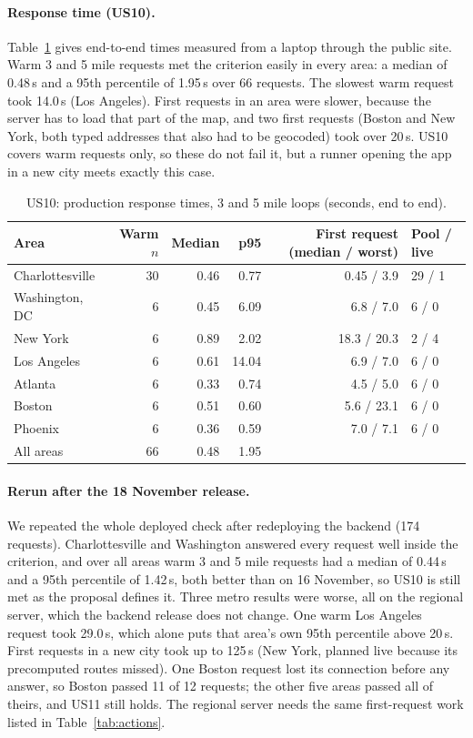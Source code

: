 \paragraph{Response time (US10).}
Table~\ref{tab:latency} gives end-to-end times measured from a laptop
through the public site. Warm 3 and 5 mile requests met the criterion easily
in every area: a median of 0.48\,s and a 95th percentile of 1.95\,s over 66
requests. The slowest warm request took 14.0\,s (Los Angeles). First requests
in an area were slower, because the server has to load that part of the map,
and two first requests (Boston and New York, both typed addresses that also
had to be geocoded) took over 20\,s. US10 covers warm requests only, so these
do not fail it, but a runner opening the app in a new city meets exactly this
case.

\begin{table}[ht]
\centering\small
\caption{US10: production response times, 3 and 5 mile loops (seconds, end to end).}
\label{tab:latency}
\begin{tabular}{@{}l r r r r l@{}}
\toprule
Area & Warm $n$ & Median & p95 & First request (median / worst) & Pool / live \\
\midrule
Charlottesville & 30 & 0.46 & 0.77 & 0.45 / 3.9 & 29 / 1 \\
Washington, DC & 6 & 0.45 & 6.09 & 6.8 / 7.0 & 6 / 0 \\
New York & 6 & 0.89 & 2.02 & 18.3 / 20.3 & 2 / 4 \\
Los Angeles & 6 & 0.61 & 14.04 & 6.9 / 7.0 & 6 / 0 \\
Atlanta & 6 & 0.33 & 0.74 & 4.5 / 5.0 & 6 / 0 \\
Boston & 6 & 0.51 & 0.60 & 5.6 / 23.1 & 6 / 0 \\
Phoenix & 6 & 0.36 & 0.59 & 7.0 / 7.1 & 6 / 0 \\
\midrule
All areas & 66 & 0.48 & 1.95 & & \\
\bottomrule
\end{tabular}
\end{table}

\paragraph{Rerun after the 18 November release.}
We repeated the whole deployed check after redeploying the backend (174
requests). Charlottesville and Washington answered every request well inside
the criterion, and over all areas warm 3 and 5 mile requests had a median of
0.44\,s and a 95th percentile of 1.42\,s, both better than on 16 November, so
US10 is still met as the proposal defines it. Three metro results were worse,
all on the regional server, which the backend release does not change. One
warm Los Angeles request took 29.0\,s, which alone puts that area's own 95th
percentile above 20\,s. First requests in a new city took up to 125\,s (New
York, planned live because its precomputed routes missed). One Boston request
lost its connection before any answer, so Boston passed 11 of 12 requests;
the other five areas passed all of theirs, and US11 still holds. The regional
server needs the same first-request work listed in Table~\ref{tab:actions}.

